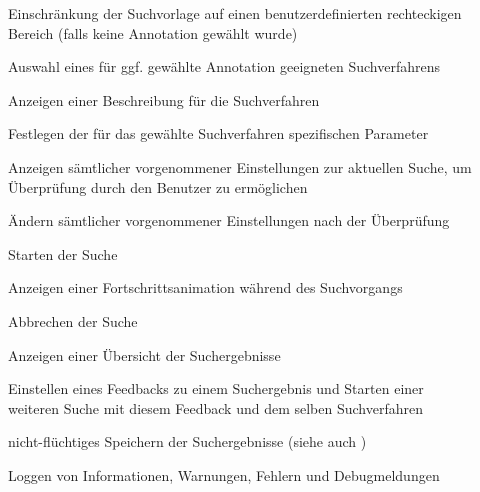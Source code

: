 \begin{description}
	\item[] Einschränkung der Suchvorlage auf einen benutzerdefinierten rechteckigen Bereich (falls keine Annotation gewählt wurde)
	\item[] Auswahl eines für ggf. gewählte Annotation geeigneten Suchverfahrens
	\item[] Anzeigen einer Beschreibung für die Suchverfahren
	\item[] Festlegen der für das gewählte Suchverfahren spezifischen Parameter
	\item[] Anzeigen sämtlicher vorgenommener Einstellungen zur aktuellen Suche, um Überprüfung durch den Benutzer zu ermöglichen
	\item[] Ändern sämtlicher vorgenommener Einstellungen nach der Überprüfung
	\newline
	\item[] Starten der Suche
	\item[] Anzeigen einer Fortschrittsanimation während des Suchvorgangs
	\item[] Abbrechen der Suche
	\newline
	\item[] Anzeigen einer \"Ubersicht der Suchergebnisse  
	\item[] Einstellen eines Feedbacks zu einem Suchergebnis und Starten einer weiteren Suche mit diesem Feedback und dem selben Suchverfahren
	\item[] nicht-flüchtiges Speichern der Suchergebnisse (siehe auch )
	\item[] Loggen von Informationen, Warnungen, Fehlern und Debugmeldungen
	 
\end{description}

